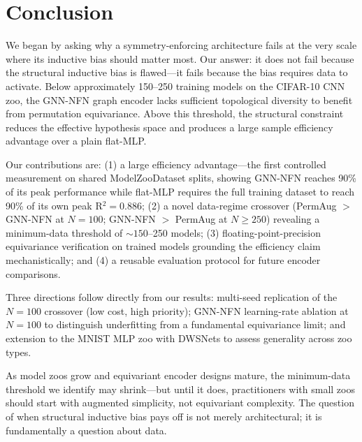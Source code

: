 \section{Conclusion}
\label{sec:conclusion}

We began by asking why a symmetry-enforcing architecture fails at the very scale where its inductive bias should matter most. Our answer: it does not fail because the structural inductive bias is flawed---it fails because the bias requires data to activate. Below approximately 150--250 training models on the CIFAR-10 CNN zoo, the GNN-NFN graph encoder lacks sufficient topological diversity to benefit from permutation equivariance. Above this threshold, the structural constraint reduces the effective hypothesis space and produces a large sample efficiency advantage over a plain flat-MLP.

Our contributions are: (1) a large efficiency advantage---the first controlled measurement on shared ModelZooDataset splits, showing GNN-NFN reaches 90\% of its peak performance while flat-MLP requires the full training dataset to reach 90\% of its own peak R$^2{=}0.886$; (2) a novel data-regime crossover (PermAug $>$ GNN-NFN at $N{=}100$; GNN-NFN $>$ PermAug at $N{\geq}250$) revealing a minimum-data threshold of ${\sim}150$--250 models; (3) floating-point-precision equivariance verification on trained models grounding the efficiency claim mechanistically; and (4) a reusable evaluation protocol for future encoder comparisons.

Three directions follow directly from our results: multi-seed replication of the $N{=}100$ crossover (low cost, high priority); GNN-NFN learning-rate ablation at $N{=}100$ to distinguish underfitting from a fundamental equivariance limit; and extension to the MNIST MLP zoo with DWSNets to assess generality across zoo types.

As model zoos grow and equivariant encoder designs mature, the minimum-data threshold we identify may shrink---but until it does, practitioners with small zoos should start with augmented simplicity, not equivariant complexity. The question of when structural inductive bias pays off is not merely architectural; it is fundamentally a question about data.
